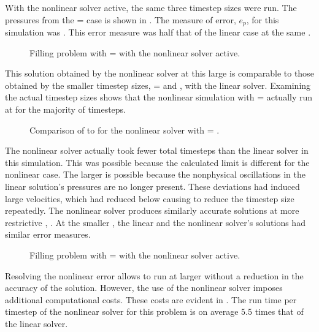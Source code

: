 With the nonlinear solver active, the same three timestep sizes were run.
The pressures from the \dtmax{} =  case is shown in .
The measure of error, $e_{p}$, for this simulation was .
This error measure was half that of the linear case at the same \dtmax{}.

\begin{figure}[h!t]
\centering

\caption{Filling problem with \dtmax{} =  with the nonlinear solver active.}
\label{fig:nlnFill1em1}
\end{figure}

This solution obtained by the nonlinear solver at this large \dtmax{} is comparable to those obtained by the smaller timestep sizes, \dtmax{} =  and , with the linear solver.
Examining the actual timestep sizes shows that the nonlinear simulation with \dtmax{} =  actually run at \dtmax{} for the majority of timesteps.

\begin{figure}[h!t]
\centering

\caption{Comparison of \dt{} to \dtcrnt{} for the nonlinear solver with \dtmax{} = .}
\label{fig:vmpDeltaTNln1em1}
\end{figure}

The nonlinear solver actually took fewer total timesteps than the linear solver in this simulation.
This was possible because the calculated \dtcrnt{} limit is different for the nonlinear case.
The larger \dtcrnt{} is possible because the nonphysical oscillations in the linear solution's pressures are no longer present.
These deviations had induced large velocities, which had reduced \dtcrnt{} below \dtmax{} causing \cobra{} to reduce the timestep size repeatedly.
The nonlinear solver produces similarly accurate solutions at more restrictive \dtmax{}, .
At the smaller \dtmax{}, the linear and the nonlinear solver's solutions had similar error measures.

\begin{figure}[h!t]
\centering

\caption{Filling problem with \dtmax{} =  with the nonlinear solver active.}
\label{fig:nlnFill1pt6em3}
\end{figure}

Resolving the nonlinear error allows \cobra{} to run at larger \dt{} without a reduction in the accuracy of the solution.
However, the use of the nonlinear solver imposes additional computational costs.
These costs are evident in .
The run time per timestep of the nonlinear solver for this problem is on average 5.5 times that of the linear solver.

